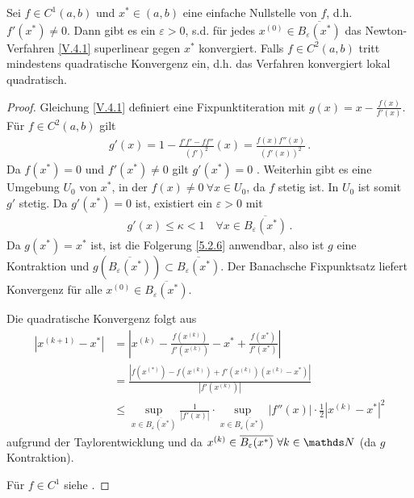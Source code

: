 \begin{Satze}
  \label{5.4.2}
  Sei $f\in C^1(a,b)$ und $x^{*}\in (a,b)$ 
  eine einfache Nullstelle von $f$, d.h. $f'(x^{*})\neq 0$.
  Dann gibt es ein  $\varepsilon >0$, 
  s.d. für jedes $x^{(0)}\in\overline{B_\varepsilon(x^{*})}$
  das Newton-Verfahren \eqref{V.4.1} superlinear gegen $x^{*}$ konvergiert.
  Falls $f\in C^2(a,b) $ tritt mindestens quadratische Konvergenz ein,
  d.h. das Verfahren konvergiert lokal quadratisch.
\end{Satze}

\begin{proof}
  Gleichung \eqref{V.4.1} definiert eine Fixpunktiteration mit $g(x) = x-\frac{f(x)}{f'(x)}$.
  Für $f\in C^2(a,b)$ gilt 
  \begin{gather*}
    g'(x) = 1- \frac{f'f'-ff''}{(f')^2}(x)
    = \frac{f(x)f''(x)}{(f'(x))^2}\, .
  \end{gather*}
  Da $f(x^{*})= 0$ und $f'(x^{*})\neq 0$ gilt $g'(x^{*})=0$ .
  Weiterhin gibt es eine Umgebung $U_0$ von $x^{*}$, 
  in der $f(x)\neq 0~\forall x\in U_0$, da $f$ stetig ist.
  In $U_0$ ist somit $g' $ stetig. 
  Da $g'(x^{*})=0$ ist, existiert ein $\varepsilon>0$ mit
  \begin{gather*}
    g'(x)\leq \kappa<1 \quad \forall x\in \overline{B_\varepsilon(x^{*})}\, .
  \end{gather*}
  Da $g(x^{*})=x^{*}$ ist, ist die Folgerung \ref{5.2.6} anwendbar,
  also ist $g$ eine Kontraktion und 
  $g(\overline{B_\varepsilon(x^{*})})\subset\overline{B_\varepsilon(x^{*})}$.
  Der Banachsche Fixpunktsatz liefert Konvergenz 
  für alle $x^{(0)}\in\overline{B_\varepsilon(x^{*})}$.
  
  Die quadratische Konvergenz folgt aus 
  \begin{align*}
    \left|x^{(k+1)}-x^{*}\right| 
    &= \left| 
      x^{(k)}
      -\frac{f\left(x^{(k)}\right)}{f'\left(x^{(k)}\right)}
      -x^{*}
      +\frac{f\left(x^{*}\right)}{f'\left(x^{*}\right)}
      \right| \\
    &= \frac{\left| 
      f\left(x^{(*)}\right)
      -f\left(x^{(k)}\right)
      +f'\left(x^{(k)}\right)\left(x^{(k)}-x^{*}\right)
      \right|}
      {\left|f'\left(x^{(k)}\right)\right|}\\
    &\leq
      \sup_{x\in\overline{B_\varepsilon\left(x^{*}\right)}}
      \frac{1}{\left|f'\left(x\right)\right|}
      \cdot
      \sup_{x\in\overline{B_\varepsilon(x^{*})}}
      \left|f''(x)\right|\cdot\frac{1}{2}\left|x^{(k)}-x^{*}\right|^2
  \end{align*}
  aufgrund der Taylorentwicklung und da
  $x^{(k)}\in\overline{B_\varepsilon(x^{*})}
  ~\forall k\in\N$ (da $g$ Kontraktion).
  
  Für $f\in C^1$ siehe \cite{haemmerlinhoffmann}.
\end{proof}

